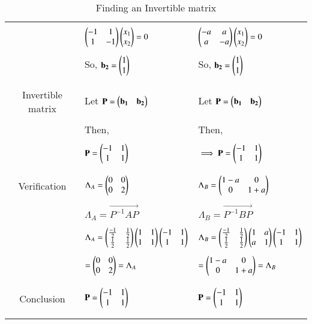 \begin{longtable}{|c|l|l|}
     &&\\
     & $\begin{pmatrix}-1&1\\1&-1\end{pmatrix}\begin{pmatrix}x_1\\x_2\end{pmatrix}= 0$
     & $\begin{pmatrix}-a&a\\a&-a\end{pmatrix}\begin{pmatrix}x_1\\x_2\end{pmatrix}= 0$\\
     &&\\
     & So, $\mathbf{b_2} = \begin{pmatrix}1\\1\end{pmatrix}$
     & So, $\mathbf{b_2} = \begin{pmatrix}1\\1\end{pmatrix}$\\
     &&\\
\hline
     &&\\
     Invertible matrix 
     & Let $\mathbf{P} = \begin{pmatrix}\mathbf{b_1} &\mathbf{b_2}\end{pmatrix}$
     & Let $\mathbf{P} = \begin{pmatrix}\mathbf{b_1} &\mathbf{b_2}\end{pmatrix}$\\
     &&\\
     & Then,
     & Then,\\
     &&\\
     & $\mathbf{P}=\begin{pmatrix}-1&1\\1&1\end{pmatrix}$
     & $ \implies \mathbf{P}=\begin{pmatrix}-1&1\\1&1\end{pmatrix}$\\
     &&\\
\hline
     &&\\
     Verification
     & $\Lambda_A=\begin{pmatrix}0&0\\0&2\end{pmatrix}$ &
     $\Lambda_B=\begin{pmatrix}1-a&0\\0&1+a\end{pmatrix}$\\
     &&\\
     & $\Lambda_{A}=\vec{P^{-1}AP}$&$\Lambda_{B}=\vec{P^{-1}BP}$\\
     &&\\
     & $\Lambda_A=\begin{pmatrix}\frac{-1}{2}&\frac{1}{2}\\ \frac 
     {1}{2}&\frac{1}{2}\end{pmatrix} \begin{pmatrix}1&1\\1&1\end{pmatrix} \begin{pmatrix}-1&1\\1&1\end{pmatrix}$
     & $\Lambda_B=\begin{pmatrix}\frac{-1}{2}&\frac{1}{2}\\ \frac
     {1}{2}&\frac{1}{2}\end{pmatrix} \begin{pmatrix}1&a\\a&1\end{pmatrix} \begin{pmatrix}-1&1\\1&1\end{pmatrix}$\\
     &&\\
     & $=\begin{pmatrix}0&0\\0&2\end{pmatrix}=\Lambda_A$ 
     & $=\begin{pmatrix}1-a&0\\0&1+a\end{pmatrix}=\Lambda_B$\\
     &&\\
     \hline
     &&\\
     Conclusion
     &  $\mathbf{P}=\begin{pmatrix}-1&1\\1&1\end{pmatrix}$
     &  $\mathbf{P}=\begin{pmatrix}-1&1\\1&1\end{pmatrix}$\\
     &&\\
\hline
\caption{Finding an Invertible matrix}
\label{eq:solutions/6/5/1/b/table:2}
\end{longtable}
